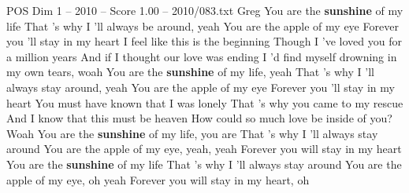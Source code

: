 \begin{textsample}{POS Dim 1 – 2010 – Score 1.00 – 2010/083.txt}  \label{ex:f1_pos_025}
Greg You are the \textbf{sunshine} of my life That 's why I 'll always be around, yeah You are the apple of my eye Forever you 'll stay in my heart I feel like this is the beginning Though I 've loved you for a million years And if I thought our love was ending I 'd find myself drowning in my own tears, woah You are the \textbf{sunshine} of my life, yeah That 's why I 'll always stay around, yeah You are the apple of my eye Forever you 'll stay in my heart You must have known that I was lonely That 's why you came to my rescue And I know that this must be heaven How could so much love be inside of you?
Woah You are the \textbf{sunshine} of my life, you are That 's why I 'll always stay around You are the apple of my eye, yeah, yeah Forever you will stay in my heart You are the \textbf{sunshine} of my life That 's why I 'll always stay around You are the apple of my eye, oh yeah Forever you will stay in my heart, oh

\end{textsample}
